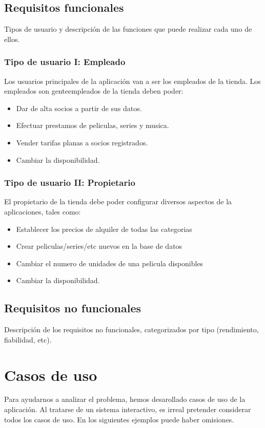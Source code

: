 \documentclass[11pt]{article}
\begin{document}
\subsection{Requisitos funcionales}
Tipos de usuario y descripción de las funciones que puede realizar cada uno de ellos.

\subsubsection{Tipo de usuario I: Empleado}
Los usuarios principales de la aplicación van a ser los empleados de la tienda. Los empleados son genteempleados de la tienda deben poder:
\begin{itemize}
	\item Dar de alta socios a partir de sus datos.
	\item Efectuar prestamos de peliculas, series y musica.
	\item Vender tarifas planas a socios registrados.
	\item Cambiar la disponibilidad.
\end{itemize}

\subsubsection{Tipo de usuario II: Propietario}
El propietario de la tienda debe poder configurar diversos aspectos de la aplicaciones, tales como:
\begin{itemize}
	\item Establecer los precios de alquiler de todas las categorias
	\item Crear peliculas/series/etc nuevos en la base de datos
	\item Cambiar el numero de unidades de una pelicula disponibles
	\item Cambiar la disponibilidad.
\end{itemize}

\subsection{Requisitos no funcionales}
Descripción de los requisitos no funcionales, categorizados por tipo (rendimiento, fiabilidad, etc).

\section{Casos de uso}
Para ayudarnos a analizar el problema, hemos desarollado casos de uso de la aplicación.
Al tratarse de un sistema interactivo, es irreal pretender considerar todos los casos de uso.
En los siguientes ejemplos puede haber omisiones.
\end{document}
